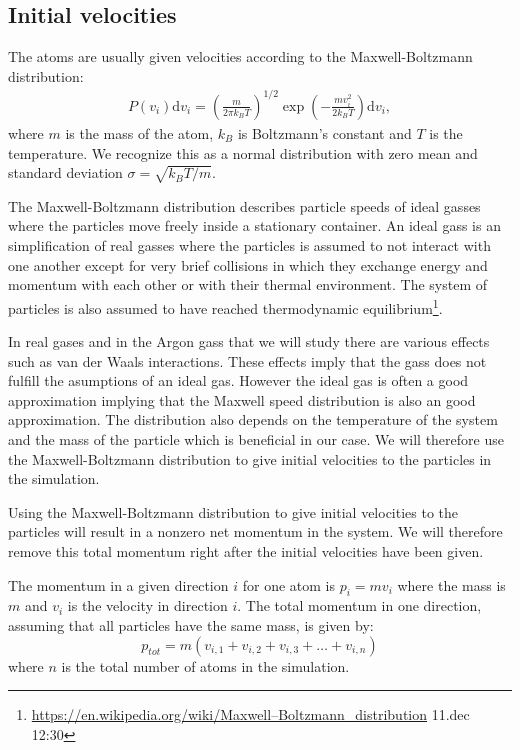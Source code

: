 \documentclass[11pt,a4wide]{article}
\newcommand{\dm}[1]{\mathrm{d}#1}
\begin{document}
\subsection{Initial velocities}
The atoms are usually given velocities according to the Maxwell-Boltzmann distribution:
\begin{align}
	\label{eq:maxwell_boltzmann}
	P(v_i)\dm{v_i} = \left(\frac{m}{2\pi k_B T}\right)^{1/2} \exp\left(-\frac{m v_i^2}{2k_B T}\right) \dm{v_i},
\end{align}
where $m$ is the mass of the atom, $k_B$ is Boltzmann's constant and $T$ is the temperature. We recognize this as a normal distribution with zero mean and standard deviation $\sigma = \sqrt{k_B T/m}$. 

The Maxwell-Boltzmann distribution describes particle speeds of ideal gasses where the particles move freely inside a stationary container. An ideal gass is an simplification of real gasses where the particles is assumed to not interact with one another except for very brief collisions in which they exchange energy and momentum with each other or with their thermal environment. The system of particles is also assumed to have reached thermodynamic equilibrium\footnote{\url{https://en.wikipedia.org/wiki/Maxwell–Boltzmann\_distribution} 11.dec 12:30}.

In real gases and in the Argon gass that we will study there are various effects such as van der Waals interactions. These effects imply that the gass does not fulfill the asumptions of an ideal gas. However the ideal gas is often a good approximation implying that the Maxwell speed distribution is also an good approximation. The distribution also depends on the temperature of the system and the mass of the particle which is beneficial in our case. We will therefore use the Maxwell-Boltzmann distribution to give initial velocities to the particles in the simulation. 

Using the Maxwell-Boltzmann distribution to give initial velocities to the particles will result in a nonzero net momentum in the system. We will therefore remove this total momentum right after the initial velocities have been given. 

The momentum in a given direction $i$ for one atom is $p_{i} = mv_i$ where the mass is $m$ and $v_i$ is the velocity in direction $i$. The total momentum in one direction, assuming that all particles have the same mass, is given by:
\[
p_{tot} = m(v_{i,1} + v_{i,2} + v_{i,3} + \dots + v_{i,n})
\]
where $n$ is the total number of atoms in the simulation. 
\end{document}
